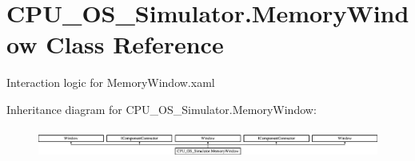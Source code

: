 \hypertarget{class_c_p_u___o_s___simulator_1_1_memory_window}{}\section{C\+P\+U\+\_\+\+O\+S\+\_\+\+Simulator.\+Memory\+Window Class Reference}
\label{class_c_p_u___o_s___simulator_1_1_memory_window}


Interaction logic for Memory\+Window.\+xaml  


Inheritance diagram for C\+P\+U\+\_\+\+O\+S\+\_\+\+Simulator.\+Memory\+Window\+:\begin{figure}[H]
\begin{center}
\leavevmode
\includegraphics[height=1.004484cm]{class_c_p_u___o_s___simulator_1_1_memory_window}
\end{center}
\end{figure}
